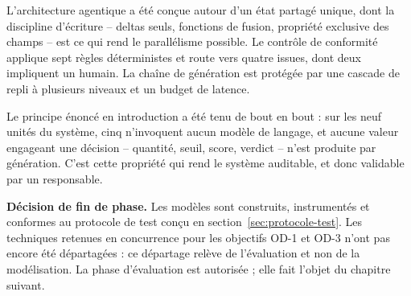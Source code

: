 L'architecture agentique a été conçue autour d'un état partagé unique, dont la discipline d'écriture -- deltas seuls, fonctions de fusion, propriété exclusive des champs -- est ce qui rend le parallélisme possible. Le contrôle de conformité applique sept règles déterministes et route vers quatre issues, dont deux impliquent un humain. La chaîne de génération est protégée par une cascade de repli à plusieurs niveaux et un budget de latence.

Le principe énoncé en introduction a été tenu de bout en bout : sur les neuf unités du système, cinq n'invoquent aucun modèle de langage, et aucune valeur engageant une décision -- quantité, seuil, score, verdict -- n'est produite par génération. C'est cette propriété qui rend le système auditable, et donc validable par un responsable.

\textbf{Décision de fin de phase.} Les modèles sont construits, instrumentés et conformes au protocole de test conçu en section~\ref{sec:protocole-test}. Les techniques retenues en concurrence pour les objectifs OD-1 et OD-3 n'ont pas encore été départagées : ce départage relève de l'évaluation et non de la modélisation. La phase d'évaluation est autorisée ; elle fait l'objet du chapitre suivant.
